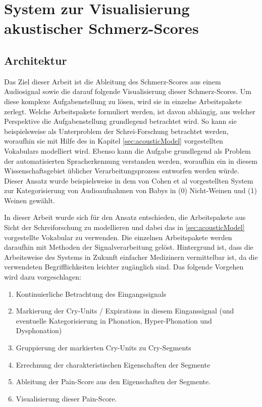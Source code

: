 \chapter{System zur Visualisierung akustischer Schmerz-Scores}
\section{Architektur}

Das Ziel dieser Arbeit ist die Ableitung des Schmerz-Scores aus einem Audiosignal sowie die darauf folgende Visualisierung dieser Schmerz-Scores. Um diese komplexe Aufgabenstellung zu lösen, wird sie in einzelne Arbeitspakete zerlegt. Welche Arbeitspakete formuliert werden, ist davon abhängig, aus welcher Perspektive die Aufgabenstellung grundlegend betrachtet wird. So kann sie beispielsweise als Unterproblem der Schrei-Forschung betrachtet werden, woraufhin sie mit Hilfe des in Kapitel \ref{sec:acousticModel} vorgestellten Vokabulars modelliert wird. Ebenso kann die Aufgabe grundlegend als Problem der automatisierten Spracherkennung verstanden werden, woraufhin ein in diesem Wissenschaftsgebiet üblicher Verarbeitungsprozess entworfen werden würde. Dieser Ansatz wurde beispielsweise in dem von Cohen et al vorgestellten System zur Kategorisierung von Audioaufnahmen von Babys in (0) Nicht-Weinen und (1) Weinen gewählt.\cite{automaticCryDetection} 

In dieser Arbeit wurde sich für den Ansatz entschieden, die Arbeitspakete aus Sicht der Schreiforschung zu modellieren und dabei das in \ref{sec:acousticModel} vorgestellte Vokabular zu verwenden. Die einzelnen Arbeitspakete werden daraufhin mit Methoden der Signalverarbeitung gelöst. Hintergrund ist, dass die Arbeitsweise des Systems in Zukunft einfacher Medizinern vermittelbar ist, da die verwendeten Begrifflichkeiten leichter zugänglich sind. Das folgende Vorgehen wird dazu vorgeschlagen:

\begin{enumerate}[leftmargin=*]
	\item Kontinuierliche Betrachtung des Eingangssignals
	\item Markierung der Cry-Units / Expirations in diesem Einganssignal (und eventuelle Kategorisierung in Phonation, Hyper-Phonation und Dysphonation)
	\item Gruppierung der markierten Cry-Units zu Cry-Segments
	\item Errechnung der charakteristischen Eigenschaften der Segmente
	\item Ableitung der Pain-Score aus den Eigenschaften der Segmente.
	\item Visualisierung dieser Pain-Score.
\end{enumerate}

